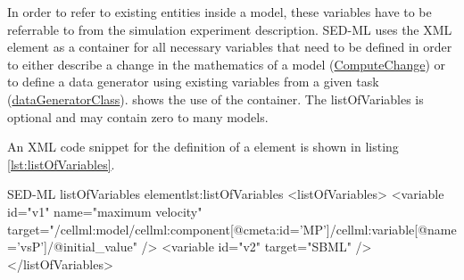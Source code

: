 \label{sec:listOfVariables}
In order to refer to existing entities inside a model, these variables have to be referrable to from the simulation experiment description. SED-ML uses the XML  element as a container for all necessary variables that need to be defined in order to either describe a change in the mathematics of a model (\hyperref[class:computeChange]{ComputeChange}) or to define a data generator using existing variables from a given task (\hyperref[lass:dataGenerator]{dataGeneratorClass}).  shows the use of the  container. The listOfVariables is optional and may contain zero to many models. 

%

An XML code snippet for the definition of a  element is shown in listing \ref{lst:listOfVariables}.
%
\begin{myXmlLst}{SED-ML listOfVariables element}{lst:listOfVariables}
<listOfVariables>
 <variable id="v1" name="maximum velocity" target="/cellml:model/cellml:component[@cmeta:id='MP']/cellml:variable[@name='vsP']/@initial_value" />
 <variable id="v2" target="SBML" />
</listOfVariables>
\end{myXmlLst}
%

